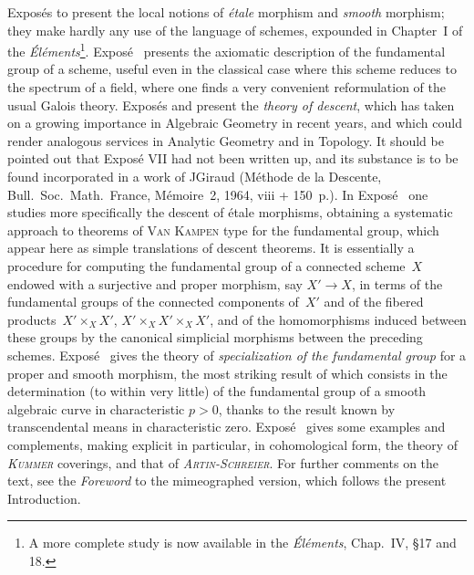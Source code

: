 Expos\'es  to  present the local notions of \emph{\'etale}
morphism and \emph{smooth} morphism; they make hardly any use of the
language of schemes, expounded in Chapter~I of the
\emph{\'El\'ements}\footnote{A more complete study is now available in
the \emph{\'El\'ements}, Chap.~IV, \oldS\S 17 and 18.}.
Expos\'e~ presents the axiomatic description of the fundamental
group of a scheme, useful even in the classical case where this scheme
reduces to the spectrum of a field, where one finds a very convenient
reformulation of the usual Galois theory. Expos\'es  and
 present the \emph{theory of descent}, which has taken on a
growing importance in Algebraic Geometry in recent years, and which could
render analogous services in Analytic Geometry and in Topology. It
should be pointed out that Expos\'e VII had not been written up, and its
substance is to be found incorporated in a work of J\ptbl Giraud
(M\'ethode de la Descente, Bull.\ Soc.\ Math.\ France, M\'emoire~2,
1964, viii + 150~p.). In Expos\'e~ one studies more specifically
the descent of \'etale morphisms, obtaining a systematic approach to
theorems of \textsc{Van Kampen} type for the fundamental group, which
appear here as simple translations of descent theorems. It is
essentially a procedure for computing the fundamental group of a
connected scheme~$X$ endowed with a surjective and proper morphism, say
$X'\to X$, in terms of the fundamental groups of the connected
components of~$X'$ and of the fibered products~$X'\times_X X'$,
$X'\times_X X'\times_X X'$, and of the homomorphisms induced between
these groups by the canonical simplicial morphisms between the preceding
schemes. Expos\'e~ gives the theory of \emph{specialization of the
fundamental group} for a proper and smooth morphism, the most striking
result of which consists in the determination (to within very little) of the
fundamental group of a smooth algebraic curve in characteristic $p>0$,
thanks to the result known by transcendental means in characteristic
zero. Expos\'e~ gives some examples and complements, making
explicit in particular, in cohomological form, the theory of
\emph{\textsc{Kummer}} coverings, and that of
\emph{\textsc{Artin}-\textsc{Schreier}}. For further comments
on the text, see the \emph{Foreword} to the mimeographed version, which
follows the present Introduction.

